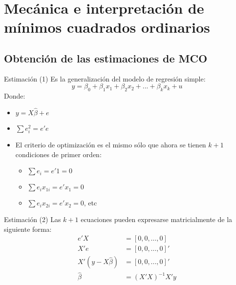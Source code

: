 \section{Mecánica e interpretación de mínimos cuadrados ordinarios}

\subsection{Obtención de las estimaciones de MCO}
\begin{frame}{Estimación (1)}
	Es la generalización del modelo de regresión simple:
	$$y=\beta_{0}+\beta_{1}x_1+\beta_{2}x_2+...+\beta_{k}x_k+u$$
	Donde:
	\begin{itemize}
		\item $y=X\widehat{\beta}+e$
		\item $\sum e_i^2=e'e$
		\item El criterio de optimización es el mismo sólo que ahora se tienen $k+1$ condiciones de primer orden:
		\bigskip
		\begin{itemize}
			\item $\sum e_i=e'1=0$
			\item $\sum e_i x_{1i}=e'x_1=0$
			\item $\sum e_i x_{2i}=e'x_2=0$, etc
		\end{itemize}
	\end{itemize}
\end{frame}
\begin{frame}{Estimación (2)}
	Las $k+1$ ecuaciones pueden expresarse matricialmente de la siguiente forma:
	\begin{align*}
		e'X & = [0, 0, \ldots ,0] \\
		X'e & = [0, 0, \ldots ,0]' \\ 
		X'(y-X\widehat{\beta}) &= [0,0,...,0]' \\
		\widehat{\beta}&= (X'X)^{-1}X'y  \\
	\end{align*}
\end{frame}
